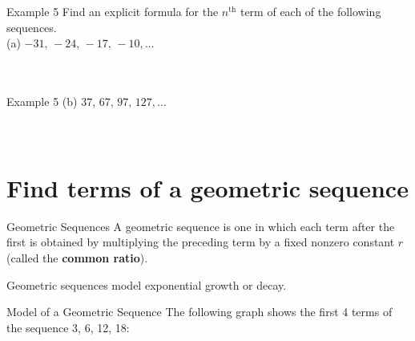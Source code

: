 \documentclass[t,usenames,dvipsnames]{beamer}
\begin{document}
\begin{frame}{Example 5}
Find an explicit formula for the $n^\text{th}$ term of each of the following sequences. \newline\\
(a) \quad $-31, \, -24, \, -17, \, -10, \dots$  \newline\\

    \newline\\
 \newline\\
\end{frame}

\begin{frame}{Example 5}
(b) \quad $37, \, 67, \, 97, \, 127, \dots$ \newline\\

    \newline\\
 \newline\\
\end{frame}

\section{Find terms of a geometric sequence}

\begin{frame}{Geometric Sequences}
A \alert{geometric sequence} is one in which each term after the first is obtained by multiplying the preceding term by a fixed nonzero constant $r$ (called the {\color{blue}\textbf{common ratio}}). \newline\\  \pause

Geometric sequences model exponential growth or decay.  \newline\\
\end{frame}

\begin{frame}{Model of a Geometric Sequence}
The following graph shows the first 4 terms of the sequence 3, 6, 12, 18:  \newline\\
\begin{center}
\end{center}
\end{frame}
\end{document}
